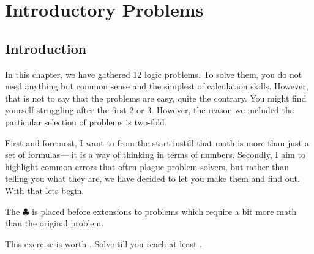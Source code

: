 \chapter{Introductory Problems}

\section{Introduction}

In this chapter, we have gathered 12 logic problems. To solve them, 
you do not need anything but common sense and the simplest of calculation skills. 
However, that is not to say that the problems are easy, quite the contrary. 
You might find yourself struggling after the first 2 or 3. 
However, the reason we included the particular selection of problems is two-fold. 

First and foremost, I want to from the start instill that math is more than just a set of formulas---
it is a way of thinking in terms of numbers. 
Secondly, I aim to highlight common errors that often plague problem solvers, 
but rather than telling you what they are, 
we have decided to let you make them and find out. With that lets begin.\par\medskip

The \(\clubsuit\) is placed before extensions to problems which require
a bit more math than the original problem.

This exercise is worth . Solve till you reach at least .  


